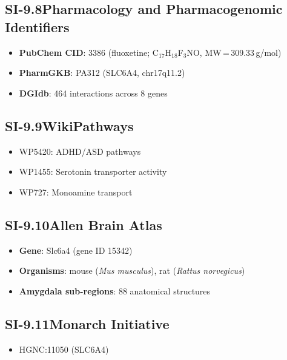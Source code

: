\subsection*{SI-9.8\quad Pharmacology and Pharmacogenomic Identifiers}

\begin{itemize}[nosep]
  \item \textbf{PubChem CID}: 3386 (fluoxetine;
        C$_{17}$H$_{18}$F$_3$NO,
        MW\,=\,309.33\,g/mol)
  \item \textbf{PharmGKB}: PA312 (SLC6A4, chr17q11.2)
  \item \textbf{DGIdb}: 464 interactions across 8 genes
\end{itemize}

\subsection*{SI-9.9\quad WikiPathways}

\begin{itemize}[nosep]
  \item WP5420: ADHD/ASD pathways
  \item WP1455: Serotonin transporter activity
  \item WP727: Monoamine transport
\end{itemize}

\subsection*{SI-9.10\quad Allen Brain Atlas}

\begin{itemize}[nosep]
  \item \textbf{Gene}: Slc6a4 (gene ID 15342)
  \item \textbf{Organisms}: mouse (\textit{Mus musculus}), rat
        (\textit{Rattus norvegicus})
  \item \textbf{Amygdala sub-regions}: 88 anatomical structures
\end{itemize}

\subsection*{SI-9.11\quad Monarch Initiative}

\begin{itemize}[nosep]
  \item HGNC:11050 (SLC6A4)
\end{itemize}

